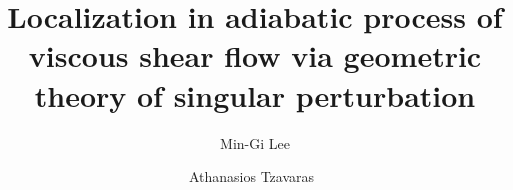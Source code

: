 \documentclass[a4paper,11pt]{article}
\begin{document}
\title{Localization in adiabatic process of viscous shear flow via geometric theory of singular perturbation}
\author{Min-Gi Lee\footnotemark[1] \and Athanasios Tzavaras\footnotemark[1]\  \footnotemark[3]  \footnotemark[4]}
\date{}

\maketitle
\renewcommand{\thefootnote}{\fnsymbol{footnote}}
\renewcommand{\thefootnote}{\arabic{footnote}}


\maketitle

\tableofcontents
\end{document}
